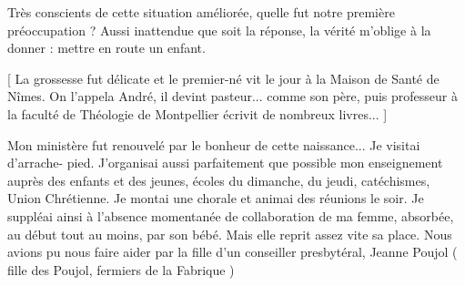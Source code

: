 Très conscients de cette situation améliorée, quelle fut notre première préoccupation ?
Aussi inattendue que soit la réponse, la vérité m’oblige à la donner : mettre en route
un enfant.

[ La grossesse fut délicate et le premier-né vit le jour à la Maison de Santé de Nîmes. On l’appela
André, il devint pasteur... comme son père, puis professeur à la faculté de Théologie de Montpellier
écrivit de nombreux livres... ]

Mon ministère fut renouvelé par le bonheur de cette naissance... Je visitai d’arrache-
pied. J’organisai aussi parfaitement que possible mon enseignement auprès des
enfants et des jeunes, écoles du dimanche, du jeudi, catéchismes, Union Chrétienne.
Je montai une chorale et animai des réunions le soir. Je suppléai ainsi à l’absence
momentanée de collaboration de ma femme, absorbée, au début tout au moins, par
son bébé. Mais elle reprit assez vite sa place. Nous avions pu nous faire aider par la
fille d’un conseiller presbytéral, Jeanne Poujol ( fille des Poujol, fermiers de la Fabrique )
